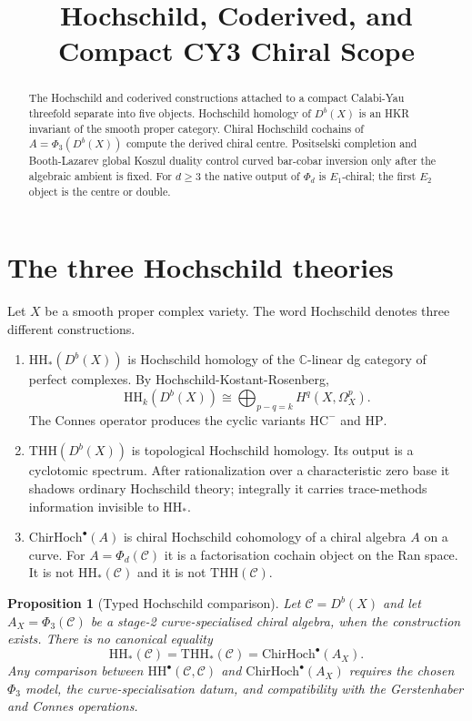 \documentclass[11pt]{amsart}
\newtheorem{proposition}[theorem]{Proposition}
\newcommand{\HH}{\mathrm{HH}}
\newcommand{\HC}{\mathrm{HC}}
\newcommand{\HP}{\mathrm{HP}}
\newcommand{\THH}{\mathrm{THH}}
\newcommand{\ChirHoch}{\mathrm{ChirHoch}}
\newcommand{\cC}{\mathcal{C}}
\newcommand{\Db}{D^{b}}
\begin{document}
\title{Hochschild, Coderived, and Compact CY3 Chiral Scope}
\author{}
\date{}

\begin{abstract}
The Hochschild and coderived constructions attached to a compact
Calabi-Yau threefold separate into five objects.  Hochschild homology
of $\Db(X)$ is an HKR invariant of the smooth proper category.
Chiral Hochschild cochains of $A=\Phi_3(\Db(X))$ compute the derived
chiral centre.  Positselski completion and Booth-Lazarev global Koszul
duality control curved bar-cobar inversion only after the algebraic
ambient is fixed.  For $d\geq3$ the native output of $\Phi_d$ is
$E_1$-chiral; the first $E_2$ object is the centre or double.
\end{abstract}

\maketitle

\tableofcontents

\section{The three Hochschild theories}

Let $X$ be a smooth proper complex variety.  The word Hochschild
denotes three different constructions.

\begin{enumerate}
\item $\HH_*(\Db(X))$ is Hochschild homology of the
$\mathbb C$-linear dg category of perfect complexes.  By
Hochschild-Kostant-Rosenberg,
\[
 \HH_k(\Db(X))
 \cong
 \bigoplus_{p-q=k} H^q(X,\Omega_X^p).
\]
The Connes operator produces the cyclic variants $\HC^-$ and $\HP$.

\item $\THH(\Db(X))$ is topological Hochschild homology.  Its output is
a cyclotomic spectrum.  After rationalization over a characteristic
zero base it shadows ordinary Hochschild theory; integrally it carries
trace-methods information invisible to $\HH_*$.

\item $\ChirHoch^\bullet(A)$ is chiral Hochschild cohomology of a
chiral algebra $A$ on a curve.  For $A=\Phi_d(\cC)$ it is a
factorisation cochain object on the Ran space.  It is not
$\HH_*(\cC)$ and it is not $\THH(\cC)$.
\end{enumerate}

\begin{proposition}[Typed Hochschild comparison]
\label{prop:typed-hochschild-comparison}
Let $\cC=\Db(X)$ and let $A_X=\Phi_3(\cC)$ be a stage-2
curve-specialised chiral algebra, when the construction exists.
There is no canonical equality
\[
 \HH_*(\cC)=\THH_*(\cC)=\ChirHoch^\bullet(A_X).
\]
Any comparison between $\HH^\bullet(\cC,\cC)$ and
$\ChirHoch^\bullet(A_X)$ requires the chosen $\Phi_3$ model,
the curve-specialisation datum, and compatibility with the
Gerstenhaber and Connes operations.
\end{proposition}
\end{document}

